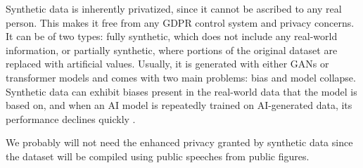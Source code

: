Synthetic data is inherently privatized, since it cannot be ascribed to any real person. This makes it free from any GDPR control system and privacy concerns. It can be of two types: fully synthetic, which does not include any real-world information, or partially synthetic, where portions of the original dataset are replaced with artificial values.
Usually, it is generated with either GANs or transformer models and comes with two main problems: bias and model collapse. Synthetic data can exhibit biases present in the real-world data that the model is based on, and when an AI model is repeatedly trained on AI-generated data, its performance declines quickly \cite{caballar_what_2023,riemann_synthetic_2026,infogdpr-advisorcom_gdpr_2025}.

We probably will not need the enhanced privacy granted by synthetic data since the dataset will be compiled using public speeches from public figures.